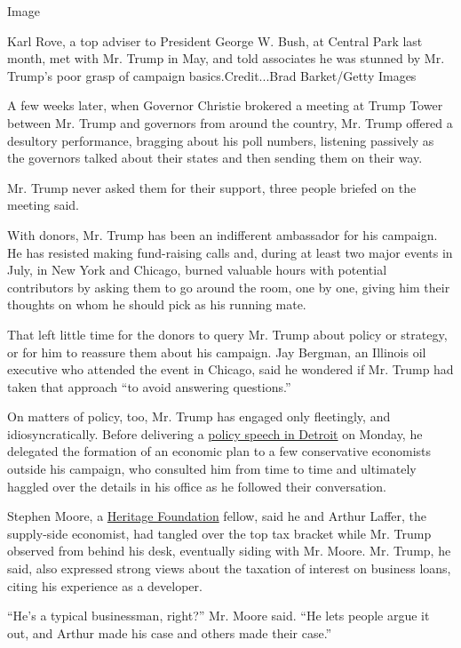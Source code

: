 Image

Karl Rove, a top adviser to President George W. Bush, at Central Park
last month, met with Mr. Trump in May, and told associates he was
stunned by Mr. Trump's poor grasp of campaign basics.Credit...Brad
Barket/Getty Images

A few weeks later, when Governor Christie brokered a meeting at Trump
Tower between Mr. Trump and governors from around the country, Mr. Trump
offered a desultory performance, bragging about his poll numbers,
listening passively as the governors talked about their states and then
sending them on their way.

Mr. Trump never asked them for their support, three people briefed on
the meeting said.

With donors, Mr. Trump has been an indifferent ambassador for his
campaign. He has resisted making fund-raising calls and, during at least
two major events in July, in New York and Chicago, burned valuable hours
with potential contributors by asking them to go around the room, one by
one, giving him their thoughts on whom he should pick as his running
mate.

That left little time for the donors to query Mr. Trump about policy or
strategy, or for him to reassure them about his campaign. Jay Bergman,
an Illinois oil executive who attended the event in Chicago, said he
wondered if Mr. Trump had taken that approach ``to avoid answering
questions.''

On matters of policy, too, Mr. Trump has engaged only fleetingly, and
idiosyncratically. Before delivering a
\href{http://www.nytimes3xbfgragh.onion/2016/08/09/us/politics/donald-trump-economy-speech.html}{policy
speech in Detroit} on Monday, he delegated the formation of an economic
plan to a few conservative economists outside his campaign, who
consulted him from time to time and ultimately haggled over the details
in his office as he followed their conversation.

Stephen Moore, a \href{http://www.heritage.org/}{Heritage Foundation}
fellow, said he and Arthur Laffer, the supply-side economist, had
tangled over the top tax bracket while Mr. Trump observed from behind
his desk, eventually siding with Mr. Moore. Mr. Trump, he said, also
expressed strong views about the taxation of interest on business loans,
citing his experience as a developer.

``He's a typical businessman, right?'' Mr. Moore said. ``He lets people
argue it out, and Arthur made his case and others made their case.''

